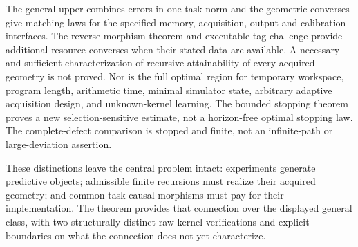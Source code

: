 The general upper combines errors in one task norm and the geometric converses give matching laws for the specified memory, acquisition, output and calibration interfaces. The reverse-morphism theorem and executable tag challenge provide additional resource converses when their stated data are available. A necessary-and-sufficient characterization of recursive attainability of every acquired geometry is not proved. Nor is the full optimal region for temporary workspace, program length, arithmetic time, minimal simulator state, arbitrary adaptive acquisition design, and unknown-kernel learning. The bounded stopping theorem proves a new selection-sensitive estimate, not a horizon-free optimal stopping law. The complete-defect comparison is stopped and finite, not an infinite-path or large-deviation assertion.

These distinctions leave the central problem intact: experiments generate predictive objects; admissible finite recursions must realize their acquired geometry; and common-task causal morphisms must pay for their implementation. The theorem provides that connection over the displayed general class, with two structurally distinct raw-kernel verifications and explicit boundaries on what the connection does not yet characterize.
